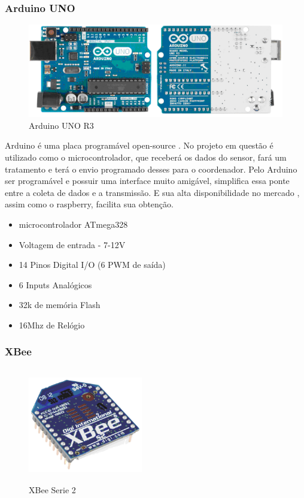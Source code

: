 \subsubsection{Arduino UNO}
\begin{figure}[H]
\includegraphics[width=1\textwidth]{figuras/arduino_uno.png}
\caption{\label{fig:arduino uno} Arduino UNO R3}
\end{figure}

Arduino é uma placa programável open-source . No projeto em questão é utilizado como o microcontrolador, que receberá os dados do sensor, fará um tratamento e terá o envio programado desses para o coordenador. Pelo Arduino ser programável e possuir uma interface muito amigável, simplifica essa ponte entre a coleta de dados e a transmissão. E sua alta disponibilidade no mercado , assim como o raspberry, facilita sua obtenção.

\begin{itemize}
\item{microcontrolador ATmega328}
\item{Voltagem de entrada - 7-12V}
\item{14 Pinos Digital I/O (6 PWM de saída)}
\item{6 Inputs Analógicos}
\item{32k de memória Flash}
\item{16Mhz de Relógio}
\end{itemize}
%
\subsubsection{XBee}
\begin{figure}[H]
\begin{center}
\includegraphics[width=5cm,height=5cm,keepaspectratio]{figuras/xbee_serie2.png}
\caption{\label{fig:xbee} XBee Serie 2}
\end{center}
\end{figure}

